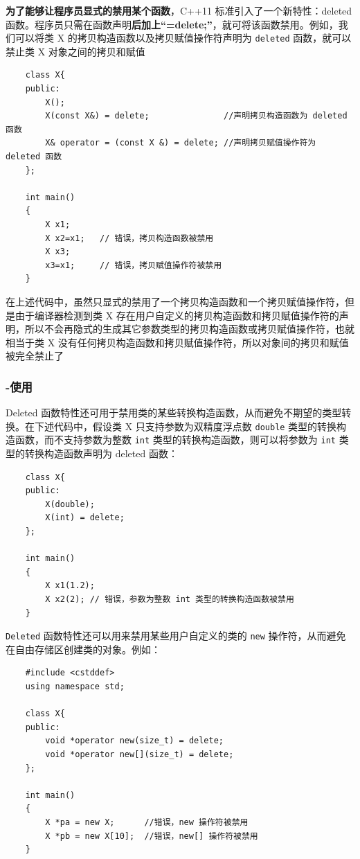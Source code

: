 \documentclass[UTF8,a4paper,12pt]{ctexbook} %
\begin{document}
				\textbf{为了能够让程序员显式的禁用某个函数}，C++11 标准引入了一个新特性：deleted 函数。程序员只需在函数声明\textbf{后加上“=delete;”}，就可将该函数禁用。例如，我们可以将类 X 的拷贝构造函数以及拷贝赋值操作符声明为 \verb|deleted| 函数，就可以禁止类 X 对象之间的拷贝和赋值
					\begin{lstlisting}
	class X{			
	public: 
		X(); 
		X(const X&) = delete;               //声明拷贝构造函数为 deleted 函数
		X& operator = (const X &) = delete; //声明拷贝赋值操作符为 deleted 函数
	}; 
	
	int main()
	{ 
		X x1; 
		X x2=x1;   // 错误，拷贝构造函数被禁用
		X x3; 
		x3=x1;     // 错误，拷贝赋值操作符被禁用
	}					
					\end{lstlisting}
				
				在上述代码中，虽然只显式的禁用了一个拷贝构造函数和一个拷贝赋值操作符，但是由于编译器检测到类 X 存在用户自定义的拷贝构造函数和拷贝赋值操作符的声明，所以不会再隐式的生成其它参数类型的拷贝构造函数或拷贝赋值操作符，也就相当于类 X 没有任何拷贝构造函数和拷贝赋值操作符，所以对象间的拷贝和赋值被完全禁止了
				
			\subsubsection{-使用}
				Deleted 函数特性还可用于禁用类的某些转换构造函数，从而避免不期望的类型转换。在下述代码中，假设类 X 只支持参数为双精度浮点数 \verb|double| 类型的转换构造函数，而不支持参数为整数 \verb|int| 类型的转换构造函数，则可以将参数为 \verb|int| 类型的转换构造函数声明为 deleted 函数：
					\begin{lstlisting}
	class X{ 
	public: 
		X(double);              
		X(int) = delete;     
	}; 
	
	int main()
	{ 
		X x1(1.2);        
		X x2(2); // 错误，参数为整数 int 类型的转换构造函数被禁用          
	}					
					\end{lstlisting}
				
				\verb|Deleted| 函数特性还可以用来禁用某些用户自定义的类的 \verb|new| 操作符，从而避免在自由存储区创建类的对象。例如：
					\begin{lstlisting}
	#include <cstddef> 
	using namespace std; 
	
	class X{ 
	public: 
		void *operator new(size_t) = delete; 
		void *operator new[](size_t) = delete; 
	}; 
	
	int main()
	{ 
		X *pa = new X;      //错误，new 操作符被禁用
		X *pb = new X[10];  //错误，new[] 操作符被禁用
	}					
					\end{lstlisting}
					
\end{document}
